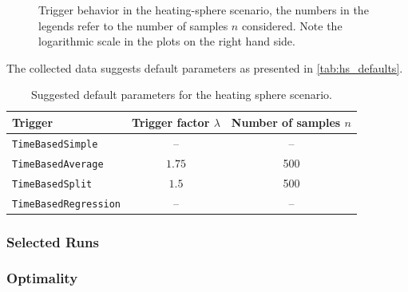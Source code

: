 \begin{figure}[htpb]
\begin{subfigure}{0.45\textwidth}
	\end{subfigure}%
	\caption{Trigger behavior in the heating-sphere scenario, the numbers in the legends refer to the number of samples $n$ considered. Note the logarithmic scale in the plots on the right hand side.}
	\label{fig:params_hs}
\end{figure}


The collected data suggests default parameters as presented in \autoref{tab:hs_defaults}.
\begin{table}[htpb]
	\centering
	\begin{tabular}{lcc}
		\toprule
		\textbf{Trigger}             & \textbf{Trigger factor $\lambda$} & \textbf{Number of samples $n$} \\ [0em]
		\midrule
		\texttt{TimeBasedSimple}     & --                             & --                             \\
		\texttt{TimeBasedAverage}    & $1.75$                            & 500                            \\
		\texttt{TimeBasedSplit}      & $1.5$                             & 500                           \\
		\texttt{TimeBasedRegression} & --                          & --                            \\
		\bottomrule
	\end{tabular}
	\caption{Suggested default parameters for the heating sphere scenario.}
	\label{tab:hs_defaults}
\end{table}

\subsubsection{Selected Runs}
\subsubsection{Optimality}

